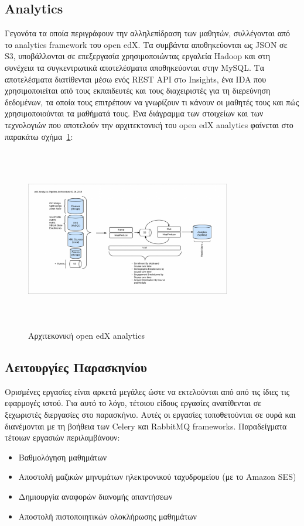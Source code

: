 \documentclass[12pt]{report}
\begin{document}
\subsection{Analytics}
Γεγονότα τα οποία περιγράφουν την αλληλεπίδραση των μαθητών, συλλέγονται από το \textlatin{analytics framework} του \textlatin{open edX}. Τα συμβάντα αποθηκεύονται ως \textlatin{JSON} σε \textlatin{S3}, υποβάλλονται σε επεξεργασία χρησιμοποιώντας εργαλεία \textlatin{Hadoop} και στη συνέχεια τα συγκεντρωτικά αποτελέσματα αποθηκεύονται στην \textlatin{MySQL}. Τα αποτελέσματα διατίθενται μέσω ενός \textlatin{REST API} στo \textlatin{Insights}, ένα \textlatin{IDA} που χρησιμοποιείται από τους εκπαιδευτές και τους διαχειριστές για τη διερεύνηση δεδομένων, τα οποία τους επιτρέπουν να γνωρίζουν τι κάνουν οι μαθητές τους και πώς χρησιμοποιούνται τα μαθήματά τους. Ένα διάγραμμα των στοιχείων και των τεχνολογιών που αποτελούν την αρχιτεκτονική του \textlatin{open edX analytics} φαίνεται στο παρακάτω σχήμα~\ref{fig:edx_analytics_arch}:
\begin{figure}[h]
\centering
\includegraphics[width=0.8\textwidth, height=8cm]{edx-architecture-analytics}
\caption{Αρχιτεκονική \textlatin{open edX analytics}}
\label{fig:edx_analytics_arch}
\end{figure}

\subsection{Λειτουργίες Παρασκηνίου}
Ορισμένες εργασίες είναι αρκετά μεγάλες ώστε να εκτελούνται από από τις ίδιες τις εφαρμογές ιστού. Για αυτό το λόγο, τέτοιου είδους εργασίες ανατίθενται σε ξεχωριστές διεργασίες στο παρασκήνιο. Αυτές οι εργασίες τοποθετούνται σε ουρά και διανέμονται με τη βοήθεια των \textlatin{Celery} και \textlatin{RabbitMQ frameworks}. Παραδείγματα τέτοιων εργασιών περιλαμβάνουν:
\begin{itemize}
  \item Βαθμολόγηση μαθημάτων
  \item Αποστολή μαζικών μηνυμάτων ηλεκτρονικού ταχυδρομείου (με το \textlatin{Amazon SES})
  \item Δημιουργία αναφορών διανομής απαντήσεων
  \item Αποστολή πιστοποιητικών ολοκλήρωσης μαθημάτων
\end{itemize}
\end{document}
